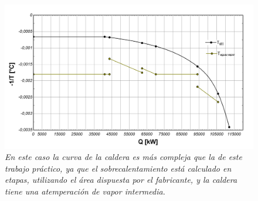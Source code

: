 \begin{figure}[ht]
	\centerline{\includegraphics[scale=0.15]{graph_02.png}}
	\caption{\textit{En este caso la curva de la caldera es más compleja que la de este trabajo práctico, ya que el sobrecalentamiento está calculado en etapas, utilizando el área dispuesta por el fabricante, y la caldera tiene una atemperación de vapor intermedia.}}
	\label{im:-1/TQ}
\end{figure}


 





